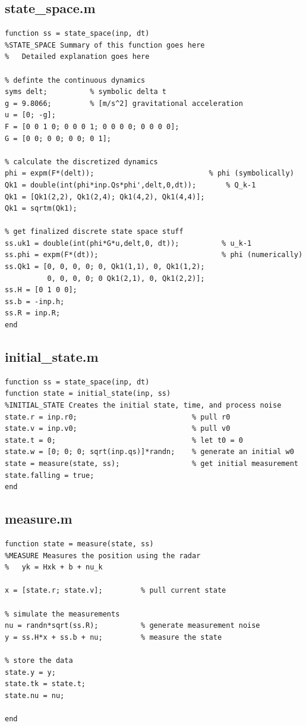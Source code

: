 \documentclass{article}
\begin{document}
\subsection{state\_space.m}
\begin{lstlisting}[style=Matlab-editor]
function ss = state_space(inp, dt)
%STATE_SPACE Summary of this function goes here
%   Detailed explanation goes here

% definte the continuous dynamics
syms delt;          % symbolic delta t
g = 9.8066;         % [m/s^2] gravitational acceleration
u = [0; -g];
F = [0 0 1 0; 0 0 0 1; 0 0 0 0; 0 0 0 0];
G = [0 0; 0 0; 0 0; 0 1];

% calculate the discretized dynamics
phi = expm(F*(delt));                           % phi (symbolically)
Qk1 = double(int(phi*inp.Qs*phi',delt,0,dt));       % Q_k-1
Qk1 = [Qk1(2,2), Qk1(2,4); Qk1(4,2), Qk1(4,4)];
Qk1 = sqrtm(Qk1);

% get finalized discrete state space stuff
ss.uk1 = double(int(phi*G*u,delt,0, dt));          % u_k-1
ss.phi = expm(F*(dt));                             % phi (numerically)
ss.Qk1 = [0, 0, 0, 0; 0, Qk1(1,1), 0, Qk1(1,2); 
          0, 0, 0, 0; 0 Qk1(2,1), 0, Qk1(2,2)];
ss.H = [0 1 0 0];
ss.b = -inp.h;
ss.R = inp.R;
end
\end{lstlisting}

\subsection{initial\_state.m}
\begin{lstlisting}[style=Matlab-editor]
function ss = state_space(inp, dt)
function state = initial_state(inp, ss)
%INITIAL_STATE Creates the initial state, time, and process noise
state.r = inp.r0;                           % pull r0
state.v = inp.v0;                           % pull v0
state.t = 0;                                % let t0 = 0
state.w = [0; 0; 0; sqrt(inp.qs)]*randn;    % generate an initial w0
state = measure(state, ss);                 % get initial measurement
state.falling = true;
end
\end{lstlisting}

\subsection{measure.m}
\begin{lstlisting}[style=Matlab-editor]
function state = measure(state, ss)
%MEASURE Measures the position using the radar
%   yk = Hxk + b + nu_k

x = [state.r; state.v];         % pull current state

% simulate the measurements
nu = randn*sqrt(ss.R);          % generate measurement noise
y = ss.H*x + ss.b + nu;         % measure the state

% store the data
state.y = y;
state.tk = state.t;
state.nu = nu;

end
\end{lstlisting}
\end{document}
